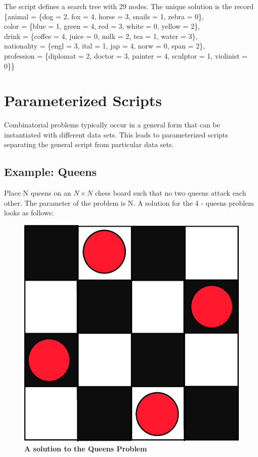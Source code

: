 \documentclass[a4paper,halfparskip]{scrartcl}
\begin{document}
The script defines a search tree with 29 nodes. 
The unique solution is the record\\
\{animal = \{dog = 2, fox = 4, horse = 3, snails = 1, zebra = 0\},\\ 
 color = \{blue = 1, green = 4, red = 3, white = 0, yellow = 2\},\\
 drink = \{coffee = 4, juice = 0, milk = 2, tea = 1, water = 3\},\\ 
 nationality = \{engl = 3, ital = 1, jap = 4, norw = 0, span = 2\},\\ 
 profession = \{diplomat = 2, doctor = 3, painter = 4, sculptor = 1, violinist = 0\}\}




\newpage
\section{Parameterized Scripts}
Combinatorial problems typically occur in a general form that can 
be instantiated with different data sets. This leads to parameterized 
scripts separating the general script from particular data sets.

\subsection{Example: Queens}
Place N queens on an $ N \times N $ chess board such that no two queens 
attack each other. The parameter of the problem is N. A solution for the 
4 - queens problem looks as follows:
\begin{figure}[htpb]
\centerline{\includegraphics*[scale=0.3]{figs/queens-4.eps}}
\caption{\textbf{A solution to the Queens Problem}}
\label{figure 11}
\end{figure}
\end{document}

